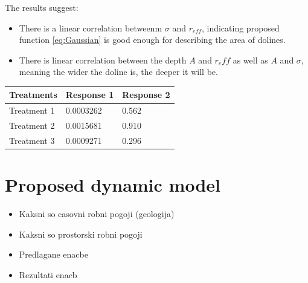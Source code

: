 \documentclass[a0,portrait]{a0poster}
\begin{document}
\begin{multicols}{2}
The results suggest:
\begin{itemize}
	\item There is a linear correlation betweenm $\sigma$ and $r_{eff}$, indicating proposed function \ref{eq:Gaussian} is good enough for describing the area of dolines.
	\item There is linear correlation between the depth $A$ and $r_eff$ as well as $A$ and $\sigma$, meaning the wider the doline is, the deeper it will be.
\end{itemize}
%
\begin{table} %
\begin{tabular}{l l l}
\toprule
\textbf{Treatments} & \textbf{Response 1} & \textbf{Response 2}\\
\midrule
Treatment 1 & 0.0003262 & 0.562 \\
Treatment 2 & 0.0015681 & 0.910 \\
Treatment 3 & 0.0009271 & 0.296 \\
\bottomrule
\end{tabular}
\end{table}



\color{SaddleBrown} %

\section*{Proposed dynamic model}

\begin{itemize}
	\item Kaksni so casovni robni pogoji (geologija)
	\item Kaksni so prostorski robni pogoji
	\item Predlagane enacbe
	\item Rezultati enacb
\end{itemize}


\end{multicols}
\end{document}
